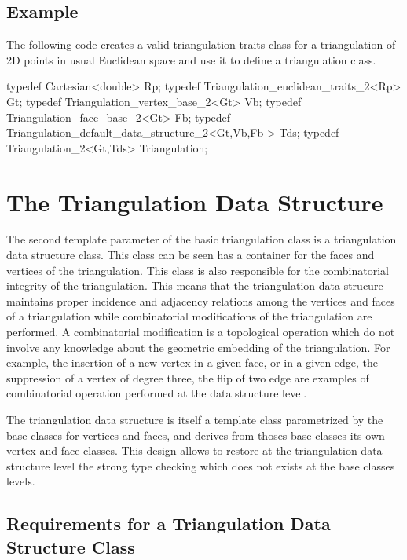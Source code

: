 \subsection{Example}
The following code creates a  valid triangulation traits class 
for a triangulation of 2D points in usual Euclidean space
and use it to define a triangulation class.

\begin{cprog}
typedef Cartesian<double> Rp;
typedef Triangulation_euclidean_traits_2<Rp> Gt;
typedef Triangulation_vertex_base_2<Gt> Vb;
typedef Triangulation_face_base_2<Gt> Fb;
typedef Triangulation_default_data_structure_2<Gt,Vb,Fb > Tds;
typedef Triangulation_2<Gt,Tds> Triangulation;
\end{cprog}



\section{The Triangulation Data Structure}
\label{I1_Sect_Tds}

The second template parameter of the basic triangulation class
 is a triangulation data structure class.
This class can be seen has a container for the 
faces and vertices of the triangulation.
This class is also responsible for the combinatorial
integrity of the triangulation. This means that
the triangulation data strucure 
maintains  proper incidence and adjacency relations among the vertices
and faces of a triangulation while
combinatorial modifications
of the triangulation are performed. A combinatorial modification 
is a  topological operation which do not 
involve any knowledge about the geometric embedding of the triangulation.
For example, the  
insertion of a new vertex in a given face, or in a given edge,
the suppression
of a vertex of degree three,  the flip of two edge are 
examples of combinatorial operation performed at the data structure level.



The triangulation data structure is itself a template class
parametrized by the base classes for vertices and faces,
and derives from thoses base classes its own 
vertex and face classes. This design  allows to restore at the 
triangulation data structure
level 
the strong type checking which does not exists at the base classes levels.


\subsection{Requirements for a Triangulation Data Structure Class}

